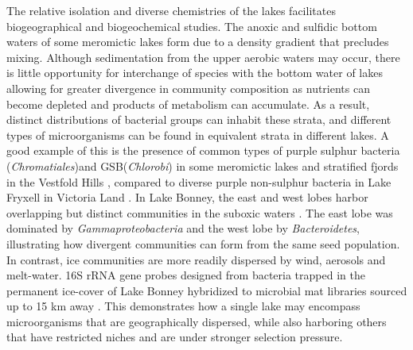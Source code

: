 The relative isolation and diverse chemistries of the lakes facilitates biogeographical and biogeochemical studies. 
The anoxic and sulfidic bottom waters of some meromictic lakes form due to a density gradient that precludes mixing. 
Although sedimentation from the upper aerobic waters may occur, 
there is little opportunity for interchange of species with the bottom water of lakes allowing for greater divergence in community composition as nutrients can become depleted 
and products of metabolism can accumulate.
As a result, distinct distributions of bacterial groups can inhabit these strata, and different types of microorganisms can be found in equivalent strata in different lakes. 
A good example of this is the presence of common types of purple sulphur bacteria (\emph{Chromatiales})and \ac{GSB}(\emph{Chlorobi}) 
in some meromictic lakes and stratified fjords in the Vestfold Hills \cite{Burke1988},
compared to diverse purple non-sulphur bacteria in Lake Fryxell in Victoria Land \cite{Karr2003}. 
In Lake Bonney, the east and west lobes harbor overlapping but distinct communities in the suboxic waters \cite{Glatz2006}.
The east lobe was dominated by \emph{Gammaproteobacteria} and the west lobe by \emph{Bacteroidetes}, illustrating how divergent communities can form from the same seed population. 
In contrast, ice communities are more readily dispersed by wind, aerosols and melt-water. 
16S \ac{rRNA} gene probes designed from bacteria trapped in the permanent ice-cover of Lake Bonney hybridized to microbial mat libraries sourced up to 15 km away \cite{Gordon2000}.
This demonstrates how a single lake may encompass microorganisms that are geographically dispersed, while also harboring others that have restricted niches and are under stronger selection pressure.


